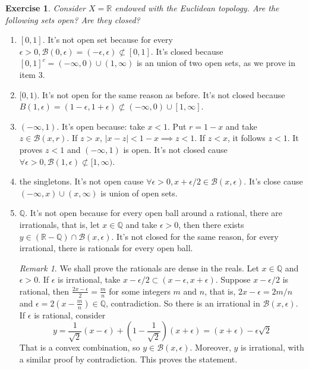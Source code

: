 \documentclass[a4paper,11pt]{article}
\theoremstyle{mytheor}
\theoremstyle{mytheor}
\newtheorem{exercise}{Exercise}
\theoremstyle{remark}
\newtheorem*{remark}{Remark}
\newcommand{\B}{\mathcal{B}}
\newcommand{\R}{\mathbb{R}}
\begin{document}
\begin{exercise}
    Consider $X = \R$ endowed with the Euclidean topology. Are the following
sets open? Are they closed?
\end{exercise}
\begin{enumerate}
    \item $[0,1]$. It's not open set because for every $\epsilon > 0, \B(0,
    \epsilon) = (-\epsilon, \epsilon) \not \subset [0,1]$. It's closed because
    $[0,1]^c = (-\infty, 0) \cup (1, \infty)$ is an union of two open sets, as
   we prove in item 3.  

    \item $[0,1)$. It's not open for the same reason as before. It's not
    closed because $B(1,\epsilon) = (1 - \epsilon, 1 + \epsilon) \not\subset
    (-\infty, 0) \cup [1, \infty]$. 

    \item $(-\infty,1)$. It's open because: take $x < 1$. Put $r = 1 - x$ and
    take $z \in \B(x, r)$. If $z > x$, $|x - z| < 1 - x \implies z < 1$. If $z
    < x$, it follows $z < 1$. It proves $z < 1$ and $(-\infty, 1)$ is open.
    It's not closed cause $\forall \epsilon > 0, \B(1,\epsilon) \not \subset
    [1, \infty)$. 
    
    \item the singletons. It's not open cause $\forall \epsilon > 0, x +
    \epsilon/2 \in \B(x,\epsilon)$. It's close cause $(-\infty,
    x)\cup(x,\infty)$ is union of open sets. 
    
    \item $\mathbb{Q}$. It's not open because for every open ball around a
    rational, there are irrationals, that is, let $x \in \mathbb{Q}$ and take
    $\epsilon > 0$, then there exists $y \in (\R - \mathbb{Q}) \cap
    \B(x,\epsilon)$. It's not closed for the same reason, for every
    irrational, there is rationals for every open ball. 

    \begin{remark}
        We shall prove the rationals are dense in the reals. Let $x \in
        \mathbb{Q}$ and $\epsilon > 0$. If $\epsilon$ is irrational, take $x-
        \epsilon/2 \subset (x - \epsilon, x + \epsilon)$. Suppose $x -
        \epsilon/2$ is rational, then $\frac{2x - \epsilon}{2} = \frac{m}{n}$
        for some integers $m$ and $n$, that is, $2x - \epsilon = 2m/n$ and
        $\epsilon = 2(x - \frac{m}{n}) \in \mathbb{Q}$, contradiction. So there
        is an irrational in $\B(x, \epsilon)$. If $\epsilon$ is rational,
        consider 
        $$y = \frac{1}{\sqrt{2}}(x - \epsilon) + (1 -
        \frac{1}{\sqrt{2}})(x + \epsilon) = (x + \epsilon) - \epsilon\sqrt{2}$$ 
        That is a convex combination, so
        $y \in \B(x, \epsilon)$. Moreover, $y$ is irrational, with a similar
        proof by contradiction. This proves the statement. 


\end{remark}
\end{enumerate}
\end{document}
